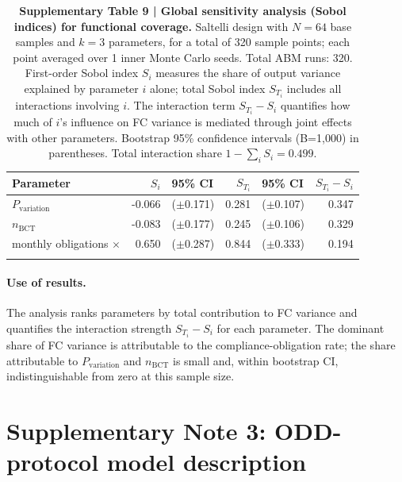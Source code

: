 \documentclass[pdflatex,sn-nature,oneside]{sn-jnl}
\begin{document}
\begin{table}[h]
\caption{%
  \textbf{Supplementary Table 9 | Global sensitivity analysis (Sobol indices) for functional coverage.}
  Saltelli design with $N=64$ base samples and $k=3$ parameters,
  for a total of 320 sample points; each point
  averaged over 1 inner Monte Carlo seeds. Total ABM runs:
  320. First-order Sobol index $S_i$ measures the share of
  output variance explained by parameter $i$ alone; total Sobol index $S_{T_i}$
  includes all interactions involving $i$. The interaction term $S_{T_i} - S_i$
  quantifies how much of $i$'s influence on FC variance is mediated through
  joint effects with other parameters. Bootstrap 95\% confidence intervals (B=1{,}000)
  in parentheses. Total interaction share $1 - \sum_i S_i = 0.499$.
}\label{tab:sobol_indices}
\begin{tabular}{@{}lrlrlr@{}}
\toprule
Parameter & $S_i$ & 95\% CI & $S_{T_i}$ & 95\% CI & $S_{T_i} - S_i$ \\
\midrule
  $P_{\text{variation}}$         & -0.066 & ($\pm$0.171) &  0.281 & ($\pm$0.107) &  0.347 \\
  $n_{\text{BCT}}$               & -0.083 & ($\pm$0.177) &  0.245 & ($\pm$0.106) &  0.329 \\
  monthly obligations $\times$   &  0.650 & ($\pm$0.287) &  0.844 & ($\pm$0.333) &  0.194 \\
\botrule
\end{tabular}
\end{table}

\paragraph{Use of results.}
The analysis ranks parameters by total contribution to FC variance and
quantifies the interaction strength $S_{T_i}-S_i$ for each parameter.
The dominant share of FC variance is attributable to the
compliance-obligation rate; the share attributable to $P_{\text{variation}}$
and $n_{\text{BCT}}$ is small and, within bootstrap CI, indistinguishable
from zero at this sample size.



\section*{Supplementary Note 3: ODD-protocol model description}
\end{document}
